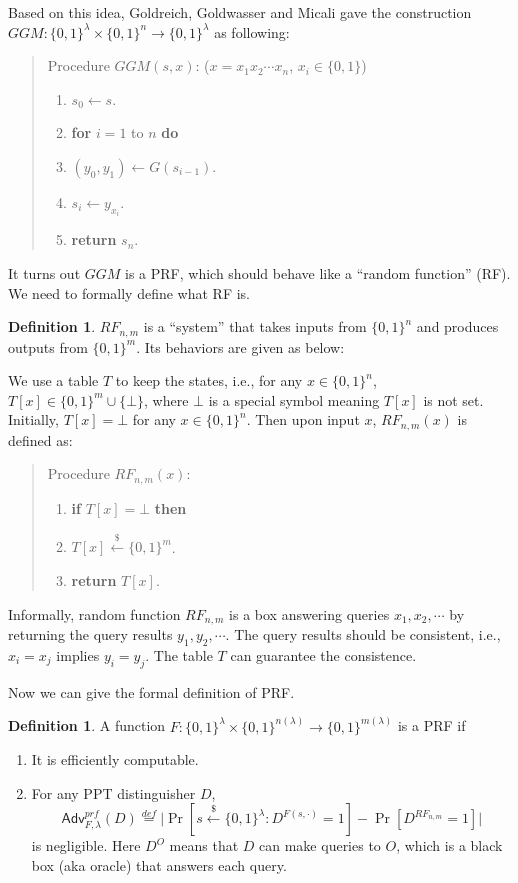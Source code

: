 \documentclass[12pt]{article}
\newcommand{\eqdef}{\stackrel{def}{=}}
\newcommand{\bits}{\{0,1\}}
\newcommand{\getsr}{\stackrel{\$}{\gets}}
\newcommand{\Adv}{\mathsf{Adv}}
\newcommand{\tab}{\hspace{0.3in}}
\theoremstyle{definition}
\newtheorem{definition}[theorem]{Definition}
\begin{document}
Based on this idea, Goldreich, Goldwasser and Micali \cite{GGM86} gave the construction $GGM : \bits^\lambda \times \bits^n \to \bits^\lambda$ as following:
\begin{quote}
Procedure $GGM(s,x)$: ($x=x_1x_2\cdots x_n$, $x_i\in\bits$)
\begin{enumerate}
\item $s_0 \gets s$.
\item {\bf for} $i=1$ to $n$ {\bf do}
\item \tab $(y_0, y_1) \gets G(s_{i-1})$.
\item \tab $s_i \gets y_{x_i}$.
\item {\bf return} $s_n$.
\end{enumerate}
\end{quote}
It turns out $GGM$ is a PRF, which should behave like a ``random function'' (RF). We need to formally define what RF is.
\begin{definition}
$RF_{n,m}$ is a ``system'' that takes inputs from $\bits^n$ and produces outputs from $\bits^m$. Its behaviors are given as below:

We use a table $T$ to keep the states, i.e., for any $x\in\bits^n$, $T[x] \in \bits^m \cup \{\bot\}$, where $\bot$ is a special symbol meaning $T[x]$ is not set. Initially, $T[x] = \bot$ for any $x\in\bits^n$. Then upon input $x$, $RF_{n,m}(x)$ is defined as:
\begin{quote}
Procedure $RF_{n,m}(x)$:
\begin{enumerate}
\item {\bf if} $T[x] = \bot$ {\bf then}
\item \tab $T[x] \getsr \bits^m$.
\item {\bf return} $T[x]$.
\end{enumerate}
\end{quote}
\end{definition}
Informally, random function $RF_{n,m}$ is a box answering queries $x_1,x_2,\cdots$ by returning the query results $y_1,y_2,\cdots$. The query results should be consistent, i.e., $x_i = x_j$ implies $y_i = y_j$. The table $T$ can guarantee the consistence.

Now we can give the formal definition of PRF.
\begin{definition}
A function $F : \bits^\lambda \times \bits^{n(\lambda)} \to \bits^{m(\lambda)}$ is a PRF if
\begin{enumerate}
\item It is efficiently computable.
\item For any PPT distinguisher $D$,
$$\Adv_{F,\lambda}^{prf}(D) \eqdef \bigg| \Pr[s \getsr \bits^\lambda: D^{F(s,\cdot)}=1] - \Pr[D^{RF_{n,m}}=1] \bigg|$$
is negligible. Here $D^{O}$ means that $D$ can make queries to $O$, which is a black box (aka oracle) that answers each query. 
\end{enumerate}
\end{definition}
\end{document}
